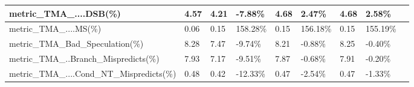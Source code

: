 \documentclass[12pt]{article}
\begin{document}
\begin{longtable}{|m{139.55pt}|m{40.35pt}|m{36.25pt}|m{36.25pt}|m{36.25pt}|m{42.10pt}|m{30.30pt}|m{44.65pt}|@{}m{0pt}@{}}
\raggedright\arraybackslash{}metric\_\allowbreak{}TMA\_\allowbreak{}....DSB(\%) & \centering\arraybackslash{}4.57 & \centering\arraybackslash{}4.21 & \cellcolor[HTML]{D9D9D9}\centering\arraybackslash{}-7.88\% & \centering\arraybackslash{}4.68 & \cellcolor[HTML]{D9D9D9}\centering\arraybackslash{}2.47\% & \centering\arraybackslash{}4.68 & \cellcolor[HTML]{D9D9D9}\centering\arraybackslash{}2.58\% & \rule[-0.00pt]{0pt}{14.40pt} \\ \hline
\raggedright\arraybackslash{}metric\_\allowbreak{}TMA\_\allowbreak{}....MS(\%) & \centering\arraybackslash{}0.06 & \centering\arraybackslash{}0.15 & \cellcolor[HTML]{D9D9D9}\centering\arraybackslash{}158.28\% & \centering\arraybackslash{}0.15 & \cellcolor[HTML]{D9D9D9}\centering\arraybackslash{}156.18\% & \centering\arraybackslash{}0.15 & \cellcolor[HTML]{D9D9D9}\centering\arraybackslash{}155.19\% & \rule[-0.00pt]{0pt}{14.40pt} \\ \hline
\cellcolor[HTML]{F8CBAD}\raggedright\arraybackslash{}metric\_\allowbreak{}TMA\_\allowbreak{}Bad\_\allowbreak{}Speculation(\%) & \cellcolor[HTML]{F8CBAD}\centering\arraybackslash{}8.28 & \cellcolor[HTML]{F8CBAD}\centering\arraybackslash{}7.47 & \cellcolor[HTML]{F8CBAD}\centering\arraybackslash{}-9.74\% & \cellcolor[HTML]{F8CBAD}\centering\arraybackslash{}8.21 & \cellcolor[HTML]{F8CBAD}\centering\arraybackslash{}-0.88\% & \cellcolor[HTML]{F8CBAD}\centering\arraybackslash{}8.25 & \cellcolor[HTML]{F8CBAD}\centering\arraybackslash{}-0.40\% & \rule[-0.00pt]{0pt}{14.40pt} \\ \hline
\raggedright\arraybackslash{}metric\_\allowbreak{}TMA\_\allowbreak{}..Branch\_\allowbreak{}Mispredicts(\%) & \centering\arraybackslash{}7.93 & \centering\arraybackslash{}7.17 & \cellcolor[HTML]{D9D9D9}\centering\arraybackslash{}-9.51\% & \centering\arraybackslash{}7.87 & \cellcolor[HTML]{D9D9D9}\centering\arraybackslash{}-0.68\% & \centering\arraybackslash{}7.91 & \cellcolor[HTML]{D9D9D9}\centering\arraybackslash{}-0.20\% & \rule[-0.00pt]{0pt}{14.40pt} \\ \hline
\raggedright\arraybackslash{}metric\_\allowbreak{}TMA\_\allowbreak{}....Cond\_\allowbreak{}NT\_\allowbreak{}Mispredicts(\%) & \centering\arraybackslash{}0.48 & \centering\arraybackslash{}0.42 & \cellcolor[HTML]{D9D9D9}\centering\arraybackslash{}-12.33\% & \centering\arraybackslash{}0.47 & \cellcolor[HTML]{D9D9D9}\centering\arraybackslash{}-2.54\% & \centering\arraybackslash{}0.47 & \cellcolor[HTML]{D9D9D9}\centering\arraybackslash{}-1.33\% & \rule[-0.00pt]{0pt}{14.40pt} \\ \hline

\end{longtable}
\end{document}
